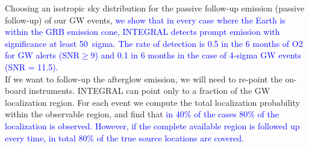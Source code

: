 \documentclass[11pt]{article}
\begin{document}
Choosing an isotropic sky distribution for the passive follow-up emission (passive follow-up) 
of our GW events, \textcolor{blue}{we show that
in every case where the Earth is within the GRB emission cone,
INTEGRAL detects prompt emission with significance at least 50~sigma.
The rate of detection is 0.5 in the 6 months of O2 for GW alerts ($\mathrm{SNR} \geq 9$) 
and 0.1 in 6 months  in the case of 4-sigma GW events (SNR = 11.5).} \\


If we want to follow-up the afterglow emission, we will need to re-point the on-board instruments.
INTEGRAL can point only to a fraction of the GW localization region. For each
event we compute the total localization probability within the observable
region, and find that \textcolor{blue}{in 40\% of the cases 80\% of the localization is
observed. However, if the complete available region is followed up every
time, in total 80\% of the true source locations are covered.}
\end{document}
